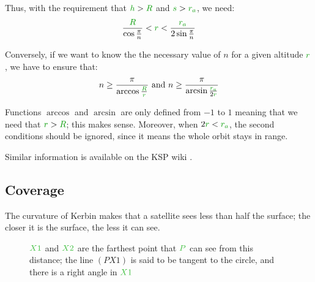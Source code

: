 Thus, with the requirement that $\dist{h} > \dist{R}$ and $\dist{s} >
\dist{r_a}$, we need:
\[
\frac {\dist{R}} {\cos \frac {\pi} n}
<
\dist{r}
<
\frac {\dist{r_a}} {2 \sin \frac {\pi} n}
\]

Conversely, if we want to know the the necessary value of $n$ for a
given altitude $\dist{r}$, we have to ensure that:
\[
n
\ge
\frac {\pi} {\arccos \frac {\dist{R}} {\dist{r}}}
\text{ and }
n
\ge
\frac {\pi} {\arcsin \frac {\dist{r_a}} {2 \dist{r}}}
\]

\begin{remark}
Functions $\arccos$ and $\arcsin$ are only defined from $-1$ to $1$
meaning that we need that $\dist{r} > \dist{R}$; this makes sense.
Moreover, when $2 \dist{r} < \dist{r_a}$, the second conditions should
be ignored, since it means the whole orbit stays in range.
\end{remark}

Similar information is available on the KSP wiki \cite{coverage}.

\subsection{Coverage}

The curvature of Kerbin makes that a satellite sees less than half the
surface; the closer it is the surface, the less it can see.

\begin{figure}[H]
	\centering
	\caption{
		$\posit{X1}$ and $\posit{X2}$ are the farthest point
		that $\posit{P}$ can see from this distance; the line
		$(PX1)$ is said to be tangent to the circle, and there
		is a right angle in $\posit{X1}$
	}
\end{figure}

